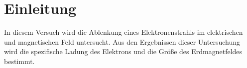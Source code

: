 
\section{Einleitung}

In diesem Versuch wird die Ablenkung eines Elektronenstrahls im
elektrischen und magnetischen Feld untersucht. Aus den Ergebnissen
dieser Untersuchung wird die spezifische Ladung des Elektrons und die
Größe des Erdmagnetfeldes bestimmt.
